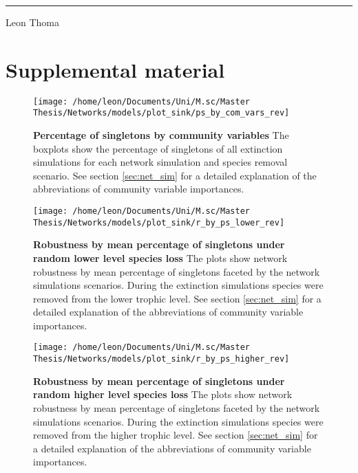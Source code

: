 \documentclass[12pt,a4paper]{article}
\begin{document}
\rule{5cm}{.4pt}\par
Leon Thoma
\newpage
\section{Supplemental material}

\begin{figure}[H]
	 \centering
	 \texttt{[image: /home/leon/Documents/Uni/M.sc/Master Thesis/Networks/models/plot\_sink/ps\_by\_com\_vars\_rev]}
	 	 \captionsetup{width = .8\textwidth}
	 \caption[Percentage of singletons by community variables]{\textbf{Percentage of singletons by community variables} The boxplots show the percentage of singletons of all extinction simulations for each network simulation and species removal scenario. See section \ref{sec:net_sim} for a detailed explanation of the abbreviations of community variable importances.}
	 \label{fig:ps_by_cv}
\end{figure}


\begin{figure}[H]
	 \centering
	 \texttt{[image: /home/leon/Documents/Uni/M.sc/Master Thesis/Networks/models/plot\_sink/r\_by\_ps\_lower\_rev]}
	 \captionsetup{width = .8\textwidth}
	 \caption[Robustness by mean percentage of singletons under random lower level species loss]{\textbf{Robustness by mean percentage of singletons under random lower level species loss} The plots show network robustness by mean percentage of singletons faceted by the network simulations scenarios. During the extinction simulations species were removed from the lower trophic level. See section \ref{sec:net_sim} for a detailed explanation of the abbreviations of community variable importances.}
	 \label{fig:r_by_ps_lower}
\end{figure}

\begin{figure}[H]
	 \centering
	 \texttt{[image: /home/leon/Documents/Uni/M.sc/Master Thesis/Networks/models/plot\_sink/r\_by\_ps\_higher\_rev]}
	 	 \captionsetup{width = .8\textwidth}
	 \caption[Robustness by mean percentage of singletons under random higher level species loss]{\textbf{Robustness by mean percentage of singletons under random higher level species loss} The plots show network robustness by mean percentage of singletons faceted by the network simulations scenarios. During the extinction simulations species were removed from the higher trophic level. See section \ref{sec:net_sim} for a detailed explanation of the abbreviations of community variable importances.}
	 \label{fig:r_by_ps_higher}
\end{figure}
\end{document}
